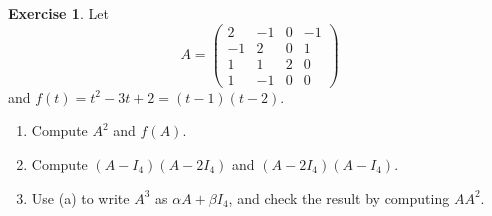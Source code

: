 \documentclass[12pt]{article}
\theoremstyle{definition}
\newtheorem{exercise}{Exercise}
\begin{document}
\begin{exercise}\label{r1-dr-polynomial}
Let
\[
A=\begin{pmatrix}2&-1&0&-1\\-1&2&0&1\\1&1&2&0\\1&-1&0&0\end{pmatrix}
\]
and \(f(t)=t^2-3t+2=(t-1)(t-2)\).
\begin{enumerate}
\item Compute \(A^2\) and \(f(A)\).
\item Compute \((A-I_4)(A-2I_4)\) and \((A-2I_4)(A-I_4)\).
\item Use (a) to write \(A^3\) as \(\alpha A+\beta I_4\), and check the result by computing \(AA^2\).
\end{enumerate}
\end{exercise}
\end{document}
